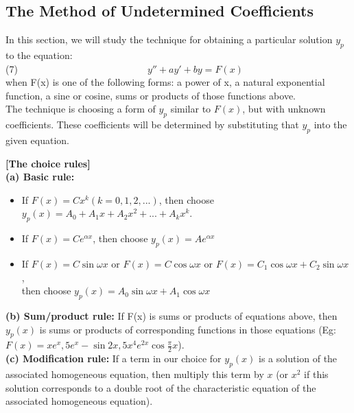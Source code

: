 \documentclass{article}
\begin{document}
\subsection{The Method of Undetermined Coefficients}
In this section, we will study the technique for obtaining a particular solution $y_p$ to the equation: \\(7)\ \ \ \ \ \ \ \ \ \ \ \ \ \ \ \ \ \ \ \ \ \ \ \ \ \ \ $y''+ay'+by=F(x)$\\
when F(x) is one of the following forms: a power of x, a natural exponential function, a sine or cosine, sums or products of those functions above.\\
The technique is choosing a form of $y_p$ similar to $F(x)$, but with unknown coefficients. These coefficients will be determined by substituting that $y_p$ into the given equation.
\begin{mybox}
    \textbf{[The choice rules]}\\
    \textbf{(a) Basic rule:}
    \begin{itemize}
        \item If $F(x)=Cx^k (k=0,1,2,...)$, then choose $y_p(x)=A_0+A_1x+A_2x^2+...+A_kx^k.$
        \item If $F(x)=Ce^{\alpha x}$, then choose $y_p(x)=Ae^{\alpha x}$
        \item If $F(x)=C\sin\omega x$ or $F(x)=C\cos\omega x$ or $F(x)=C_1\cos\omega x+C_2\sin\omega x$, \\then choose $y_p(x)=A_0\sin\omega x+A_1\cos\omega x$
    \end{itemize}
    \textbf{(b) Sum/product rule:} If F(x) is sums or products of equations above, then $y_p(x)$ is sums or products of corresponding functions in
those equations (Eg: $F(x)=xe^x,5e^x-\sin2x,5x^4e^{2x}\cos \displaystyle\frac{\pi}{2}x$).\\
    \textbf{(c) Modification rule:} If a term in our choice for $y_p(x)$ is a solution of the associated homogeneous equation, then multiply this term by $x$ (or $x^2$ if this solution corresponds to a double root of the characteristic equation of the associated homogeneous equation).
\end{mybox}
\end{document}
